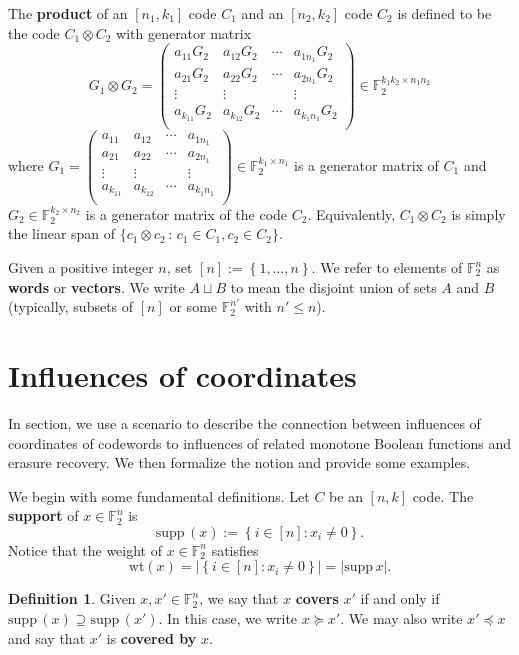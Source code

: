 \documentclass[12pt]{article}
\newcommand{\F}{\mathbb{F}}
\newcommand{\wt}{\mathrm{wt}}
\def\F{\mathbb F}
\def\supp{\mathrm{supp}\,}
\theoremstyle{definition}
\newtheorem{definition}[theorem]{Definition}
\begin{document}
The {\bf product} of an $[n_1,k_1]$ code $C_1$ and an $[n_2,k_2]$ code $C_2$ is defined to be the code \(C_1 \otimes C_2\) with generator matrix  
\[ G_1 \otimes G_2 = \left(\begin{array}{cccc} a_{11}G_2 & a_{12}G_2 & \cdots & a_{1n_1}G_2 \\ a_{21}G_2 & a_{22}G_2 & \cdots & a_{2n_1}G_2 \\
\vdots & \vdots &  & \vdots \\ a_{k_11}G_2 & a_{k_12}G_2 & \cdots & a_{k_1n_1}G_2 \\ \end{array}\right)
\in \F_{2}^{k_1k_2\times n_1n_2}
\] where $G_1 =
\left(\begin{array}{cccc} a_{11} & a_{12} & \cdots & a_{1n_1} \\ a_{21} & a_{22} & \cdots & a_{2n_1} \\
\vdots & \vdots &  & \vdots \\ a_{k_11} & a_{k_12} & \cdots & a_{k_1n_1} \\ \end{array}\right) \in \F_{2}^{k_1\times n_1}$ is a generator matrix of $C_1$ and  $G_2  \in \F_{2}^{k_2\times n_2}$ is a generator matrix of the code $C_2$. Equivalently, \(C_1 \otimes C_2\) is simply the linear span of \( \{c_1 \otimes c_2 \,:\, c_1 \in C_1, c_2 \in C_2\}\).

Given a positive integer $n$, set $[n]:=\left\{ 1, \dots, n \right\}$.
We refer to elements of $\F_2^n$ as {\bf words} or {\bf vectors}. 
 We write $A \sqcup B$ to mean the disjoint union of sets $A$ and $B$ (typically, subsets of $[n]$ or some $\F_2^{n'}$ with $n' \leq n$). 
 


\section{Influences of coordinates}
In section, we use a scenario to describe the connection between influences of coordinates of codewords to influences of related monotone Boolean functions and erasure recovery. We then formalize the notion and provide some examples. 

We begin with some fundamental definitions. Let $C$ be an \([n,k]\) code. The {\bf support} of $x \in \F_2^n$ is $$\supp(x) := \left\{ i \in [n]\colon x_i \neq 0 \right\}.$$ Notice that the weight of $x \in \F_2^n$ satisfies $$\wt(x) =  | \left\{ i \in [n]\colon x_i \neq 0 \right\} | = | \supp x |.$$
\begin{definition}
Given $x,x' \in \F_2^n$, we say that $x$ {\bf covers} $x'$ if and only if $\supp(x) \supseteq \supp(x')$. In this case, we write $x \succeq x'$. We may also write $x' \preceq x$ 
and say that $x'$ is {\bf covered by} $x$.
\end{definition}
\end{document}
